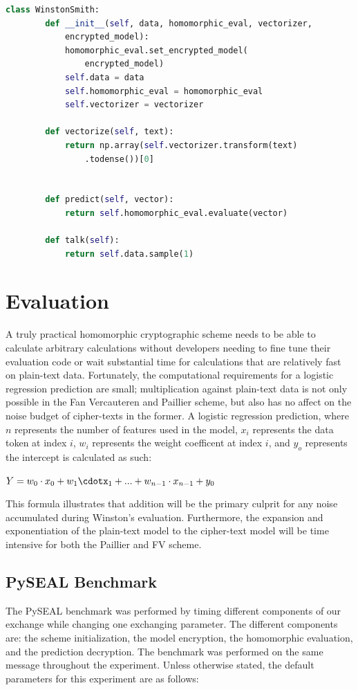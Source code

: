 \documentclass[10pt, a4paper]{article}
\begin{document}
	
	\begin{lstlisting}[language=Python,caption = Winstom Smith]
	class WinstonSmith:
		def __init__(self, data, homomorphic_eval, vectorizer, 
			encrypted_model):
			homomorphic_eval.set_encrypted_model(
				encrypted_model)
			self.data = data
			self.homomorphic_eval = homomorphic_eval
			self.vectorizer = vectorizer
		
		def vectorize(self, text):
			return np.array(self.vectorizer.transform(text)
				.todense())[0]
		
		
		def predict(self, vector):
			return self.homomorphic_eval.evaluate(vector)
		
		def talk(self):
			return self.data.sample(1)
	\end{lstlisting}
		
	\section{Evaluation}
	A truly practical homomorphic cryptographic scheme needs to be able to calculate arbitrary calculations without developers needing to fine tune their evaluation code or wait substantial time for calculations that are relatively fast on plain-text data.  Fortunately, the computational requirements for a logistic regression prediction are small; multiplication against plain-text data is not only possible in the Fan Vercauteren and Paillier scheme, but also has no affect on the noise budget of cipher-texts in the former. A logistic regression prediction, where $n$ represents the number of features used in the model, $x_i$ represents the data token at index $i$, $w_i$ represents the weight coefficent at index $i$, and $y_o$ represents the intercept is calculated as such:
	
		 {\centering \Medium \(
        Y = w_0 \cdot x_0 + w_1\cdotx_1 + ... + w_{n-1}\cdot x_{n-1} + y_0
        
    \)\par}
    This formula illustrates that addition will be the primary culprit for any noise accumulated during Winston's evaluation. Furthermore, the expansion and exponentiation of the plain-text model to the cipher-text model will be time intensive for both the Paillier and FV scheme. 
    
	\subsection{PySEAL Benchmark}
	The PySEAL benchmark was performed by timing different components of our exchange while changing one exchanging parameter. The different components are: the scheme initialization, the model encryption, the homomorphic evaluation, and the prediction decryption. The benchmark was performed on the same message throughout the experiment. Unless otherwise stated, the default parameters for this experiment are as follows:
	
\end{document}
